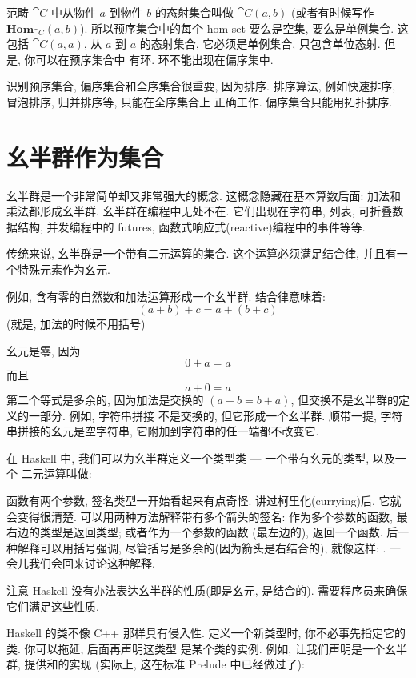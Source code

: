 范畴 $\cat{C}$ 中从物件 $a$ 到物件 $b$ 的态射集合叫做 $\cat{C}(a, b)$ (或者有时候写作
$\mathbf{Hom}_{\cat{C}}(a, b)$). 所以预序集合中的每个 hom-set 要么是空集, 要么是单例集合. 这包括
$\cat{C}(a, a)$, 从 $a$ 到 $a$ 的态射集合, 它必须是单例集合, 只包含单位态射. 但是, 你可以在预序集合中
有环. 环不能出现在偏序集中.

识别预序集合, 偏序集合和全序集合很重要, 因为排序. 排序算法, 例如快速排序, 冒泡排序, 归并排序等, 只能在全序集合上
正确工作. 偏序集合只能用拓扑排序.

\section{幺半群作为集合}

幺半群是一个非常简单却又非常强大的概念. 这概念隐藏在基本算数后面: 加法和乘法都形成幺半群. 幺半群在编程中无处不在.
它们出现在字符串, 列表, 可折叠数据结构, 并发编程中的 futures, 函数式响应式(reactive)编程中的事件等等.

传统来说, 幺半群是一个带有二元运算的集合. 这个运算必须满足结合律, 并且有一个特殊元素作为幺元.

例如, 含有零的自然数和加法运算形成一个幺半群. 结合律意味着:
\[(a + b) + c = a + (b + c)\]
(就是, 加法的时候不用括号)

幺元是零, 因为
\[0 + a = a\]
而且
\[a + 0 = a\]
第二个等式是多余的, 因为加法是交换的 $(a + b = b + a)$, 但交换不是幺半群的定义的一部分. 例如, 字符串拼接
不是交换的, 但它形成一个幺半群. 顺带一提, 字符串拼接的幺元是空字符串, 它附加到字符串的任一端都不改变它.

在 Haskell 中, 我们可以为幺半群定义一个类型类 --- 一个带有幺元的类型, 以及一个
二元运算叫做:


函数有两个参数, 签名类型一开始看起来有点奇怪. 讲过柯里化(currying)后, 它就会变得很清楚.
可以用两种方法解释带有多个箭头的签名: 作为多个参数的函数, 最右边的类型是返回类型; 或者作为一个参数的函数
(最左边的), 返回一个函数. 后一种解释可以用括号强调, 尽管括号是多余的(因为箭头是右结合的), 就像这样:
. 一会儿我们会回来讨论这种解释.

注意 Haskell 没有办法表达幺半群的性质(即是幺元, 是结合的).
需要程序员来确保它们满足这些性质.

Haskell 的类不像 C++ 那样具有侵入性. 定义一个新类型时, 你不必事先指定它的类. 你可以拖延, 后面再声明这类型
是某个类的实例. 例如, 让我们声明是一个幺半群, 提供和的实现
(实际上, 这在标准 Prelude 中已经做过了):

